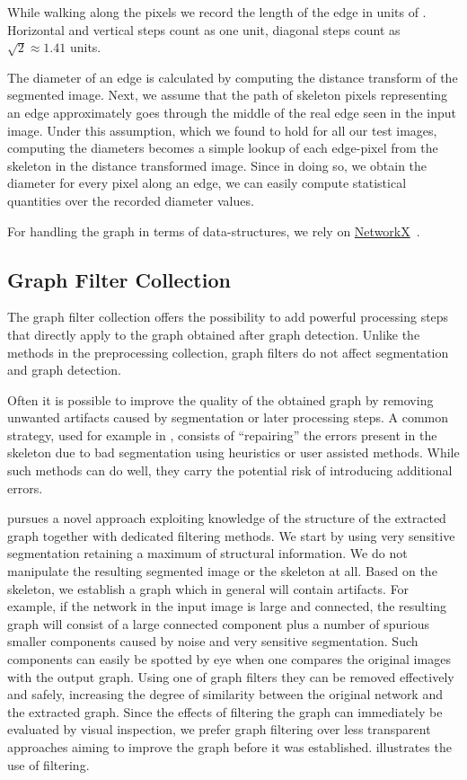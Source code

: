 		While walking along the pixels we record the length of the edge in units of \si{\pixel}. Horizontal and vertical steps count as one unit, diagonal steps count as $\sqrt 2\approx 1.41$ units.

		The diameter of an edge is calculated by computing the distance transform of the segmented image. Next, we assume that the path of skeleton pixels representing an edge approximately goes through the middle of the real edge seen in the input image. Under this assumption, which we found to hold for all our test images, computing the diameters becomes a simple lookup of each edge-pixel from the skeleton in the distance transformed image. Since in doing so, we obtain the diameter for every pixel along an edge, we can easily compute statistical quantities over the recorded diameter values.

		For handling the graph in terms of data-structures, we rely on \href{https://networkx.github.io/documentation/latest/index.html}{NetworkX}~\cite{networkx}.

	\subsection{Graph Filter Collection}

		The graph filter collection offers the possibility to add powerful processing steps that directly apply to the graph obtained after graph detection. Unlike the methods in the preprocessing collection, graph filters do not affect segmentation and graph detection.

		Often it is possible to improve the quality of the obtained graph by removing unwanted artifacts caused by segmentation or later processing steps. A common strategy, used for example in \cite{baumgarten2010detection, baumgarten2012computational}, consists of ``repairing'' the errors present in the skeleton due to bad segmentation using heuristics or user assisted methods. While such methods can do well, they carry the potential risk of introducing additional errors. 

		\NEFI pursues a novel approach exploiting knowledge of the structure of the extracted graph together with dedicated filtering methods. We start by using very sensitive segmentation retaining a maximum of structural information. We do not manipulate the resulting segmented image or the skeleton at all. Based on the skeleton, we establish a graph which in general will contain artifacts. For example, if the network in the input image is large and connected, the resulting graph will consist of a large connected component plus a number of spurious smaller components caused by noise and very sensitive segmentation. Such components can easily be spotted by eye when one compares the original images with the output graph. Using one of \NEFIs graph filters they can be removed effectively and safely, increasing the degree of similarity between the original network and the extracted graph. Since the effects of filtering the graph can immediately be evaluated by visual inspection, we prefer graph filtering over less transparent approaches aiming to improve the graph before it was established.  illustrates the use of filtering.

